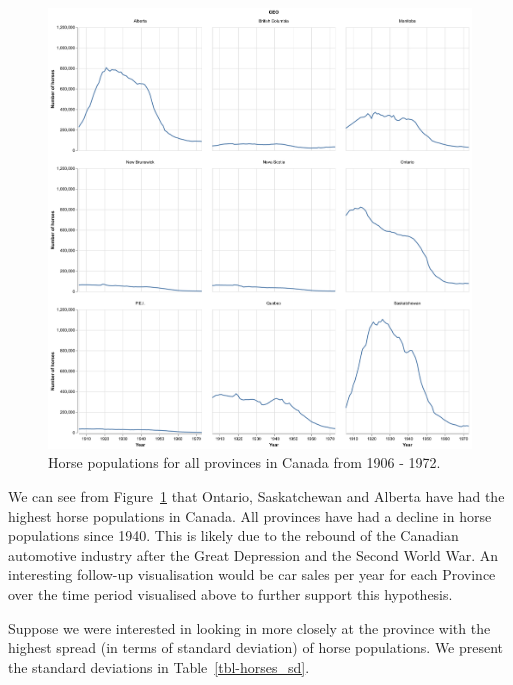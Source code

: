 \documentclass[
  letterpaper,
  DIV=11,
  numbers=noendperiod]{scrartcl}
\begin{document}
\begin{figure}

{\centering \includegraphics[width=1\textwidth,height=\textheight]{../results/horse_pops_plot.png}

}

\caption{\label{fig-horse_pops_plot}Horse populations for all provinces
in Canada from 1906 - 1972.}

\end{figure}

We can see from Figure~\ref{fig-horse_pops_plot} that Ontario,
Saskatchewan and Alberta have had the highest horse populations in
Canada. All provinces have had a decline in horse populations since
1940. This is likely due to the rebound of the Canadian automotive
industry after the Great Depression and the Second World War. An
interesting follow-up visualisation would be car sales per year for each
Province over the time period visualised above to further support this
hypothesis.

Suppose we were interested in looking in more closely at the province
with the highest spread (in terms of standard deviation) of horse
populations. We present the standard deviations in
Table~\ref{tbl-horses_sd}.
\end{document}
